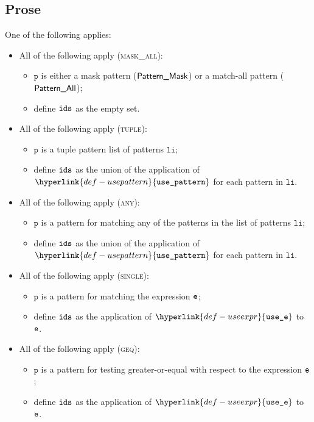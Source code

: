 \documentclass{book}
\newcommand\useexpr[0]{\hyperlink{def-useexpr}{\texttt{use\_e}}}
\newcommand\usepattern[0]{\hyperlink{def-usepattern}{\texttt{use\_pattern}}}
\newcommand\vp[0]{\texttt{p}}
\newcommand\vli[0]{\texttt{li}}
\begin{document}
\subsection{Prose}
One of the following applies:
\begin{itemize}
  \item All of the following apply (\textsc{mask\_all}):
  \begin{itemize}
    \item $\vp$ is either a mask pattern ($\textsf{Pattern\_Mask}$) or a match-all pattern ($\textsf{Pattern\_All}$);
    \item define $\texttt{ids}$ as the empty set.
  \end{itemize}

  \item All of the following apply (\textsc{tuple}):
  \begin{itemize}
    \item $\vp$ is a tuple pattern list of patterns $\vli$;
    \item define $\texttt{ids}$ as the union of the application of $\usepattern$ for each pattern in $\vli$.
  \end{itemize}

  \item All of the following apply (\textsc{any}):
  \begin{itemize}
    \item $\vp$ is a pattern for matching any of the patterns in the list of patterns $\vli$;
    \item define $\texttt{ids}$ as the union of the application of $\usepattern$ for each pattern in $\vli$.
  \end{itemize}

  \item All of the following apply (\textsc{single}):
  \begin{itemize}
    \item $\vp$ is a pattern for matching the expression $\texttt{e}$;
    \item define $\texttt{ids}$ as the application of $\useexpr$ to $\texttt{e}$.
  \end{itemize}

  \item All of the following apply (\textsc{geq}):
  \begin{itemize}
    \item $\vp$ is a pattern for testing greater-or-equal with respect to the expression $\texttt{e}$;
    \item define $\texttt{ids}$ as the application of $\useexpr$ to $\texttt{e}$.
  \end{itemize}


\end{itemize}
\end{document}
